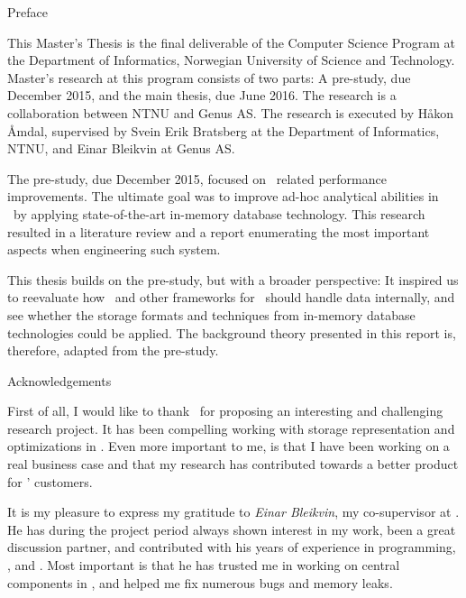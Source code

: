 {\Huge Preface}
\vspace{1cm}

This Master's Thesis is the final deliverable of the Computer Science Program at the Department of Informatics, Norwegian University of Science and Technology. Master's research at this program consists of two parts: A pre-study, due December 2015, and the main thesis, due June 2016. The research is a collaboration between NTNU and Genus AS. The research is executed by Håkon Åmdal, supervised by Svein Erik Bratsberg at the Department of Informatics, NTNU, and Einar Bleikvin at Genus AS.

The pre-study, due December 2015, focused on \bi~related performance improvements. The ultimate goal was to improve ad-hoc analytical abilities in \gap~by applying state-of-the-art in-memory database technology. This research resulted in a literature review and a report enumerating the most important aspects when engineering such system.

This thesis builds on the pre-study, but with a broader perspective: It inspired us to reevaluate how \gap~and other frameworks for \mde~should handle data internally, and see whether the storage formats and techniques from in-memory database technologies could be applied. The background theory presented in this report is, therefore, adapted from the pre-study.

\vspace{1cm}

{\Large Acknowledgements}


First of all, I would like to thank \genus~for proposing an interesting and challenging research project. It has been compelling working with storage representation and optimizations in \gap. Even more important to me, is that I have been working on a real business case and that my research has contributed towards a better product for \genus' customers.

It is my pleasure to express my gratitude to \textit{Einar Bleikvin}, my co-supervisor at \genus. He has during the project period always shown interest in my work, been a great discussion partner, and contributed with his years of experience in programming, \delphi, and \gap. Most important is that he has trusted me in working on central components in \gap, and helped me fix numerous bugs and memory leaks.

